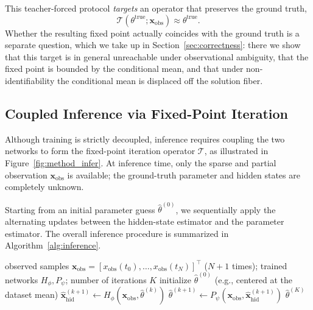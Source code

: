 This teacher-forced protocol \emph{targets} an operator that preserves the ground truth,
\begin{equation*}
\mathcal{T}(\theta^\mathrm{true}; \mathbf{x}_{\mathrm{obs}}) \approx \theta^\mathrm{true}.
\end{equation*}
Whether the resulting fixed point actually coincides with the ground truth is a separate question, which we take up in Section~\ref{sec:correctness}: there we show that this target is in general unreachable under observational ambiguity, that the fixed point is bounded by the conditional mean, and that under non-identifiability the conditional mean is displaced off the solution fiber.

\subsection{Coupled Inference via Fixed-Point Iteration}
\label{subsec:inference}

Although training is strictly decoupled, inference requires coupling the two networks to form the fixed-point iteration operator $\mathcal{T}$, as illustrated in Figure~\ref{fig:method_infer}. At inference time, only the sparse and partial observation $\mathbf{x}_{\mathrm{obs}}$ is available; the ground-truth parameter and hidden states are completely unknown.

Starting from an initial parameter guess $\hat{\theta}^{(0)}$, we sequentially apply the alternating updates between the hidden-state estimator and the parameter estimator. The overall inference procedure is summarized in Algorithm~\ref{alg:inference}. 

\begin{algorithm}[t]
\caption{Fixed-step iterative inference for parameter estimation}
\label{alg:inference}
\begin{algorithmic}[1]
    \REQUIRE observed samples $\mathbf{x}_\mathrm{obs}=[x_{\mathrm{obs}}(t_0),\ldots,x_{\mathrm{obs}}(t_{N})]^\top$ ($N+1$ times);
    trained networks $H_\phi,P_\psi$; 
    number of iterations $K$
    \STATE initialize $\hat{\theta}^{(0)}$ (e.g., centered at the dataset mean)
        \STATE $\widehat{\mathbf{x}}_{\mathrm{hid}}^{(k+1)} \gets H_\phi(\mathbf{x}_\mathrm{obs},\widehat{\theta}^{(k)})$
        \STATE $\widehat{\theta}^{(k+1)} \gets P_\psi(\mathbf{x}_\mathrm{obs},\widehat{\mathbf{x}}_{\mathrm{hid}}^{(k+1)})$
    \ENDFOR
    \RETURN $\widehat{\theta}^{(K)}$
\end{algorithmic}
\end{algorithm}

